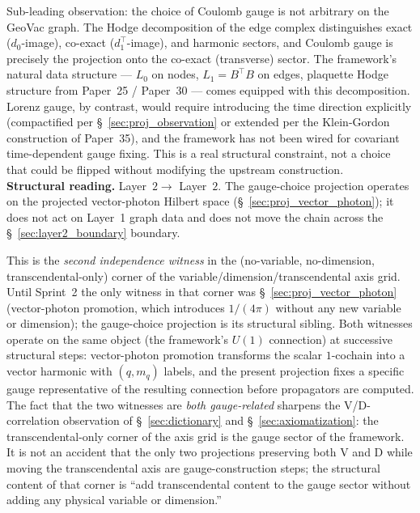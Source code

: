\documentclass[11pt]{article}
\begin{document}
Sub-leading observation: the choice of Coulomb gauge is not arbitrary
on the GeoVac graph.  The Hodge decomposition of the edge complex
distinguishes exact ($d_0$-image), co-exact ($d_1^\top$-image), and
harmonic sectors, and Coulomb gauge is precisely the projection onto
the co-exact (transverse) sector.  The framework's natural data
structure --- $L_0$ on nodes, $L_1 = B^\top B$ on edges,
plaquette Hodge structure from Paper~25 / Paper~30 --- comes equipped
with this decomposition.  Lorenz gauge, by contrast, would require
introducing the time direction explicitly (compactified per
\S~\ref{sec:proj_observation} or extended per the Klein-Gordon
construction of Paper~35), and the framework has not been wired for
covariant time-dependent gauge fixing.  This is a real structural
constraint, not a choice that could be flipped without modifying the
upstream construction.\\
\textbf{Structural reading.}  Layer~$2 \to$ Layer~$2$.  The gauge-choice
projection operates on the projected vector-photon Hilbert space
(\S~\ref{sec:proj_vector_photon}); it does not act on Layer~1 graph
data and does not move the chain across the
\S~\ref{sec:layer2_boundary} boundary.

This is the \emph{second independence witness} in the
(no-variable, no-dimension, transcendental-only) corner of the
variable/dimension/transcendental axis grid.  Until Sprint~2 the only
witness in that corner was \S~\ref{sec:proj_vector_photon} (vector-photon
promotion, which introduces $1/(4\pi)$ without any new variable or
dimension); the gauge-choice projection is its structural sibling.
Both witnesses operate on the same object (the framework's $U(1)$
connection) at successive structural steps: vector-photon promotion
transforms the scalar $1$-cochain into a vector harmonic with
$(q, m_q)$ labels, and the present projection fixes a specific gauge
representative of the resulting connection before propagators are
computed.  The fact that the two witnesses are \emph{both
gauge-related} sharpens the V/D-correlation observation of
\S~\ref{sec:dictionary} and \S~\ref{sec:axiomatization}: the
transcendental-only corner of the axis grid is the gauge sector of the
framework.  It is not an accident that the only two projections
preserving both V and D while moving the transcendental axis are
gauge-construction steps; the structural content of that corner is
``add transcendental content to the gauge sector without adding any
physical variable or dimension.''
\end{document}
